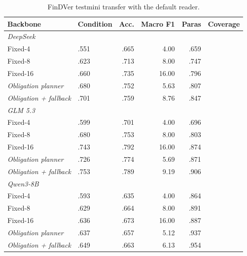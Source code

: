 \begin{table}[t]
\centering
\scriptsize
\setlength{\tabcolsep}{4pt}
\caption{FinDVer testmini transfer with the default reader.}
\label{tab:findver}
\begin{tabular}{llrrrr}
\toprule
Backbone & Condition & Acc. & Macro F1 & Paras & Coverage \\
\midrule
\multicolumn{6}{l}{\textit{DeepSeek}} \\
Fixed-4 & .551 & .665 & 4.00 & .659 \\
Fixed-8 & .623 & .713 & 8.00 & .747 \\
Fixed-16 & .660 & .735 & 16.00 & .796 \\
\textit{Obligation planner} & .680 & .752 & 5.63 & .807 \\
\textit{Obligation + fallback} & .701 & .759 & 8.76 & .847 \\
\midrule
\multicolumn{6}{l}{\textit{GLM 5.3}} \\
Fixed-4 & .599 & .701 & 4.00 & .696 \\
Fixed-8 & .680 & .753 & 8.00 & .803 \\
Fixed-16 & .743 & .792 & 16.00 & .874 \\
\textit{Obligation planner} & .726 & .774 & 5.69 & .871 \\
\textit{Obligation + fallback} & .753 & .789 & 9.19 & .906 \\
\midrule
\multicolumn{6}{l}{\textit{Qwen3-8B}} \\
Fixed-4 & .593 & .635 & 4.00 & .864 \\
Fixed-8 & .629 & .664 & 8.00 & .891 \\
Fixed-16 & .636 & .673 & 16.00 & .887 \\
\textit{Obligation planner} & .637 & .657 & 5.12 & .937 \\
\textit{Obligation + fallback} & .649 & .663 & 6.13 & .954 \\
\bottomrule
\end{tabular}
\end{table}
